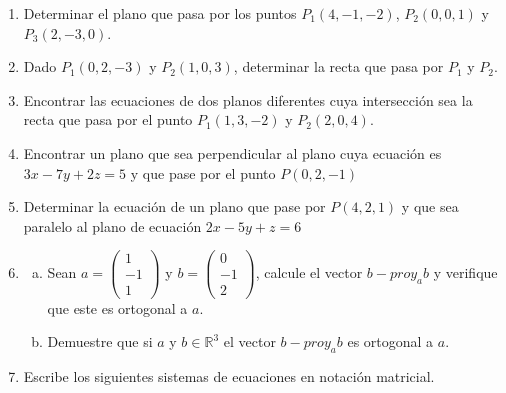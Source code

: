 \documentclass[12pt]{article}
\newenvironment{preguntas}
{\begin{enumerate}\itemsep12pt
	}
	{
	\end{enumerate}
}
\newcommand{\R}{\mathbb{R}}
\begin{document}
\begin{preguntas}
\begin{tasks}
$$\begin{pmatrix}
			5\\
			10
		\end{pmatrix};\qquad
			\begin{pmatrix}
			-3\\
			8\\
			-11
		\end{pmatrix}$$
\end{tasks}
\item Determinar el plano que pasa por los puntos $P_1(4,-1,-2)$, $P_2(0,0,1)$ y $P_3(2,-3,0)$.
\item Dado $P_1(0,2,-3)$ y $P_2(1,0,3)$, determinar la recta que pasa por $P_1$ y $P_2$.
\item Encontrar las ecuaciones de dos planos diferentes cuya intersección sea la recta que pasa por el punto $P_1(1,3,-2)$ y $P_2(2,0,4)$.
\item Encontrar un plano que sea perpendicular al plano cuya ecuación es $3x -7y +2z = 5$ y que pase por el punto $P(0,2,-1)$
\item Determinar la ecuación de un plano que pase por $P(4,2,1)$ y que sea paralelo al plano de ecuación $2x-5y+z=6$
\item 
\begin{enumerate}[a)]
\item Sean $a=\left(\begin{array}{r}
      1\\-1\\1
    \end{array}\right)$ y $b=\left(\begin{array}{r}
      0\\-1\\2
    \end{array}\right)$, calcule el vector\textbf{ $b-proy_a b$ }y verifique que este es ortogonal a $a$.
\item Demuestre que si $a$ y $b\in\R^3$ el vector $b-proy_a b$ es ortogonal a $a$.
\end{enumerate}
\item Escribe los siguientes sistemas de ecuaciones en notación matricial.
\end{preguntas}
\end{document}
